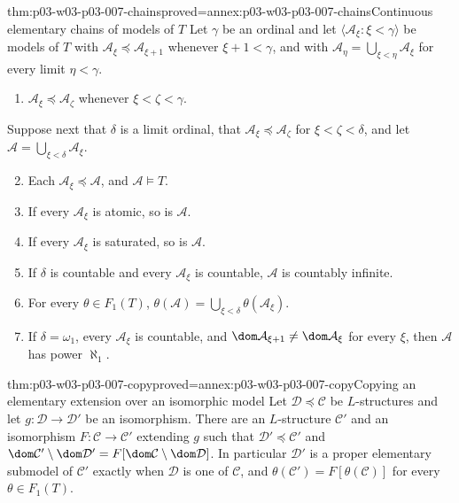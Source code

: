 \begin{hblemma}{thm:p03-w03-p03-007-chains}{proved=annex:p03-w03-p03-007-chains}{Continuous elementary chains of models of \(T\)}
Let \(\gamma\) be an ordinal and let \(\langle\mathcal A_\xi:\xi<\gamma\rangle\)
be models of \(T\) with \(\mathcal A_\xi\preccurlyeq\mathcal A_{\xi+1}\)
whenever \(\xi+1<\gamma\), and with
\(\mathcal A_\eta=\bigcup_{\xi<\eta}\mathcal A_\xi\) for every limit
\(\eta<\gamma\).
\begin{enumerate}
\item \(\mathcal A_\xi\preccurlyeq\mathcal A_\zeta\) whenever
      \(\xi<\zeta<\gamma\).
\end{enumerate}
Suppose next that \(\delta\) is a limit ordinal, that
\(\mathcal A_\xi\preccurlyeq\mathcal A_\zeta\) for \(\xi<\zeta<\delta\),
and let \(\mathcal A=\bigcup_{\xi<\delta}\mathcal A_\xi\).
\begin{enumerate}\setcounter{enumi}{1}
\item Each \(\mathcal A_\xi\preccurlyeq\mathcal A\), and \(\mathcal A\models T\).
\item If every \(\mathcal A_\xi\) is atomic, so is \(\mathcal A\).
\item If every \(\mathcal A_\xi\) is saturated, so is \(\mathcal A\).
\item If \(\delta\) is countable and every \(\mathcal A_\xi\) is countable,
      \(\mathcal A\) is countably infinite.
\item For every \(\theta\in F_1(T)\),
      \(\theta(\mathcal A)=\bigcup_{\xi<\delta}\theta(\mathcal A_\xi)\).
\item If \(\delta=\omega_1\), every \(\mathcal A_\xi\) is countable, and
      \(\dom\mathcal A_{\xi+1}\neq\dom\mathcal A_\xi\) for every \(\xi\),
      then \(\mathcal A\) has power \(\aleph_1\).
\end{enumerate}
\end{hblemma}

\begin{hblemma}{thm:p03-w03-p03-007-copy}{proved=annex:p03-w03-p03-007-copy}{Copying an elementary extension over an isomorphic model}
Let \(\mathcal D\preccurlyeq\mathcal C\) be \(L\)-structures and let
\(g\colon\mathcal D\to\mathcal D'\) be an isomorphism. There are an
\(L\)-structure \(\mathcal C'\) and an isomorphism
\(F\colon\mathcal C\to\mathcal C'\) extending \(g\) such that
\(\mathcal D'\preccurlyeq\mathcal C'\) and
\(\dom\mathcal C'\setminus\dom\mathcal D'=F[\dom\mathcal C\setminus\dom\mathcal D]\).
In particular \(\mathcal D'\) is a proper elementary submodel of
\(\mathcal C'\) exactly when \(\mathcal D\) is one of \(\mathcal C\), and
\(\theta(\mathcal C')=F[\theta(\mathcal C)]\) for every \(\theta\in F_1(T)\).
\end{hblemma}

